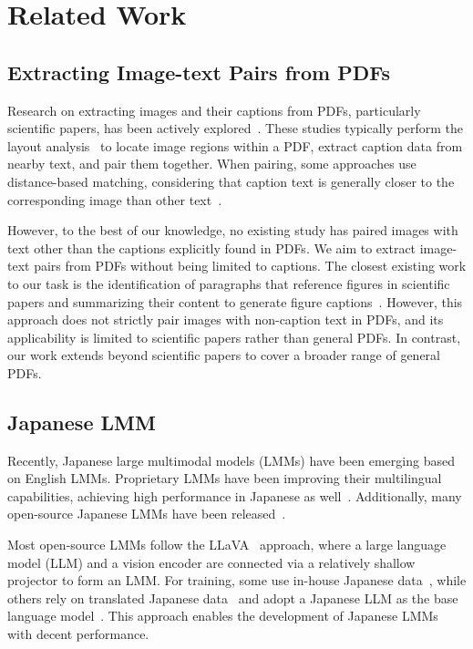 \section{Related Work}
\subsection{Extracting Image-text Pairs from PDFs}
Research on extracting images and their captions from PDFs, particularly scientific papers, has been actively explored~\cite{clark2015looking,clark2016pdffigures,siegel2018extracting,naiman2022figure,okamoto2023constructing}.
These studies typically perform the layout analysis~\cite{shen2021layoutparser} to locate image regions within a PDF, extract caption data from nearby text, and pair them together.
When pairing, some approaches use distance-based matching, considering that caption text is generally closer to the corresponding image than other text~\cite{okamoto2023constructing}.

However, to the best of our knowledge, no existing study has paired images with text other than the captions explicitly found in PDFs.
We aim to extract image-text pairs from PDFs without being limited to captions.
The closest existing work to our task is the identification of paragraphs that reference figures in scientific papers and summarizing their content to generate figure captions~\cite{huang2023summaries}.
However, this approach does not strictly pair images with non-caption text in PDFs, and its applicability is limited to scientific papers rather than general PDFs.
In contrast, our work extends beyond scientific papers to cover a broader range of general PDFs.


\subsection{Japanese LMM}\label{subsec:relatedwork-JA-LMM}
Recently, Japanese large multimodal models (LMMs) have been emerging based on English LMMs.
Proprietary LMMs have been improving their multilingual capabilities, achieving high performance in Japanese as well~\cite{openai2023gpt4,openai2024gpt4o,anthropic2024claude3,geminipro}.
Additionally, many open-source Japanese LMMs have been released~\cite{JapaneseInstructBLIPAlpha,JapaneseStableVLM,akiba2025evolutionary,BlipJapaneseStableLM,inoue2024heron,cyberagent2024llava,VILAjp}.

Most open-source LMMs follow the LLaVA~\cite{llava} approach, where a large language model (LLM) and a vision encoder are connected via a relatively shallow projector to form an LMM.
For training, some use in-house Japanese data~\cite{cyberagent2024llava}, while others rely on translated Japanese data~\cite{JapaneseInstructBLIPAlpha,JapaneseStableVLM,BlipJapaneseStableLM,inoue2024heron} and adopt a Japanese LLM as the base language model~\cite{cyberagent2024llava,JapaneseInstructBLIPAlpha,JapaneseStableVLM,BlipJapaneseStableLM,inoue2024heron}.
This approach enables the development of Japanese LMMs with decent performance.

